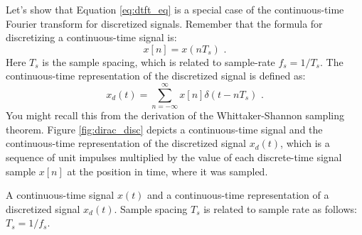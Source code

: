 Let's show that Equation \ref{eq:dtft_eq} is a special case of the
continuous-time Fourier transform for discretized signals. Remember
that the formula for discretizing a continuous-time signal is:
\begin{equation}
    x[n] = x(nT_s)\,\,.%
\end{equation}
Here $T_s$ is the sample spacing, which is related to sample-rate
$f_s=1/T_s$. The continuous-time representation of the discretized
signal is defined as:
\begin{equation}
    x_d(t) = \sum_{n=-\infty}^{\infty} x[n] \delta(t-n T_s) \,\,.
\end{equation}
You might recall this from the derivation of the Whittaker-Shannon
sampling theorem. Figure \ref{fig:dirac_disc} depicts a
continuous-time signal and the continuous-time representation of the
discretized signal $x_d(t)$, which is a sequence of unit impulses
multiplied by the value of each discrete-time signal sample $x[n]$ at
the position in time, where it was sampled.
\begin{marginfigure}[-3cm]
    \begin{center}
    \end{center}
    \caption{A continuous-time signal $x(t)$ and a continuous-time representation of 
    a discretized signal $x_d(t)$. Sample spacing $T_s$ is related to sample rate as follows: $T_s = 1/f_s$.}
    \label{fig:dirac_disc}
\end{marginfigure}

